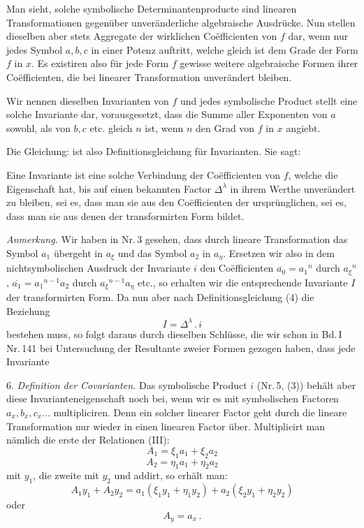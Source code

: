 Man sieht, solche symbolische Determinantenproducte sind linearen
Transformationen gegenüber unveränderliche algebraische Ausdrücke.
Nun stellen dieselben aber stets Aggregate der wirklichen
Co\"efficienten von $f$ dar, wenn nur jedes Symbol $a, b, c$ in
einer Potenz auftritt, welche gleich ist dem Grade der Form $f$
in $x$. Es existiren also für jede Form $f$ gewisse weitere
algebraische Formen ihrer Co\"efficienten, die bei linearer
Transformation unverändert bleiben.

Wir nennen dieselben \glqq Invarianten\grqq{} von $f$ und jedes symbolische
Product
stellt eine solche Invariante dar, vorausgesetzt, dass die Summe
aller Exponenten von $a$ sowohl, als von $b, c$ etc. gleich $n$
ist, wenn $n$ den Grad von $f$ in $x$ angiebt.


Die Gleichung:
ist also Definitionsgleichung für Invarianten. Sie sagt:

\glqq Eine Invariante ist eine solche Verbindung der Co\"efficienten von
$f$, welche die Eigenschaft hat, bis auf einen bekannten Factor
$\Delta^\lambda$ in ihrem Werthe unverändert zu bleiben, sei es,
dass man sie aus den Co\"efficienten der ursprünglichen, sei es,
dass man sie aus denen der transformirten Form bildet.\grqq{}

\textit{Anmerkung.} Wir haben in Nr.\,3 gesehen, dass durch lineare
Transformation das Symbol $a_1$ übergeht in $a_\xi$ und das
Symbol $a_2$ in $a_\eta$. Ersetzen wir also in dem
nichtsymbolischen Ausdruck der Invariante $i$ den Co\"efficienten
$\overline{a_0}=a_1{}^n$ durch $a_\xi{}^n$,
$\overline{a_1}=a_1{}^{n-1}a_2$ durch $a_\xi{}^{n-1}a_\eta$ etc.,
so erhalten wir die entsprechende Invariante $I$ der
transformirten Form. Da nun aber nach Definitionsgleichung (4)
die Beziehung
\[
I = \Delta^\lambda\,.\,i
\]
bestehen muss, so folgt daraus durch dieselben Schlüsse, die wir
schon in Bd.\,I Nr.\,141 bei Untersuchung der Resultante zweier
Formen gezogen haben, dass jede Invariante 

6. \textit{Definition der Covarianten.} Das symbolische Product $i$
(Nr.\,5, (3)) behält aber diese Invarianteneigenschaft noch bei,
wenn wir es mit symbolischen Factoren $a_x, b_x, c_x\ldots$
multipliciren. Denn ein solcher linearer Factor geht durch die
lineare Transformation nur wieder in einen linearen Factor über.
Multiplicirt man nämlich die erste der Relationen (III):
\[
A_1 = \xi_1 a_1 + \xi_2 a_2
\]
\[
A_2 = \eta_1 a_1 + \eta_2 a_2
\]
mit $y_1$, die zweite mit $y_2$ und addirt, so erhält man:
\[
A_1y_1 + A_2y_2 = a_1(\xi_1y_1+\eta_1y_2) + a_2(\xi_2y_1+\eta_2y_2)
\]
oder
\[
A_y = a_x\,.
\]

